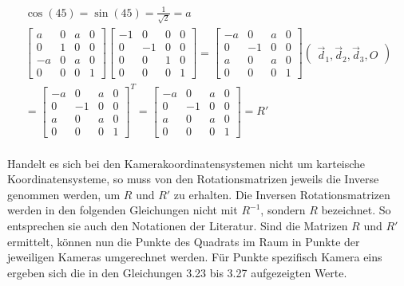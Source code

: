 \begin{gather}
	\cos(45)=\sin(45)=\frac{1}{\sqrt{2}} = a\\
	\begin{bmatrix}
		a&0&a&0\\
		0&1&0&0\\
		-a&0&a&0\\
		0&0&0&1
	\end{bmatrix}
	\begin{bmatrix}
		-1&0&0&0\\
		0&-1&0&0\\
		0&0&1&0\\
		0&0&0&1
	\end{bmatrix}
	=\begin{bmatrix}
		-a&0&a&0\\
		0&-1&0&0\\
		a&0&a&0\\
		0&0&0&1
	\end{bmatrix}
	\begin{pmatrix}
		\vec{d}_1,\vec{d}_2,\vec{d}_3,O
	\end{pmatrix}\\
	=\begin{bmatrix}
		-a&0&a&0\\
		0&-1&0&0\\
		a&0&a&0\\
		0&0&0&1
	\end{bmatrix}^T
	=
	\begin{bmatrix}
		-a&0&a&0\\
		0&-1&0&0\\
		a&0&a&0\\
		0&0&0&1
	\end{bmatrix}
	= R'
\end{gather}\\

Handelt es sich bei den Kamerakoordinatensystemen nicht um karteische Koordinatensysteme, so muss von den Rotationsmatrizen jeweils die Inverse genommen werden, um \ensuremath{R} und \ensuremath{R'} zu erhalten. Die Inversen Rotationsmatrizen werden in den folgenden Gleichungen nicht mit $R^{-1}$, sondern $R$ bezeichnet. So entsprechen sie auch den Notationen der Literatur\cite{Elements,HZ}. Sind die Matrizen \ensuremath{R} und \ensuremath{R'} ermittelt, können nun die Punkte des Quadrats im Raum in Punkte der jeweiligen Kameras umgerechnet werden. Für Punkte spezifisch Kamera eins ergeben sich die in den Gleichungen 3.23 bis 3.27 aufgezeigten Werte.


